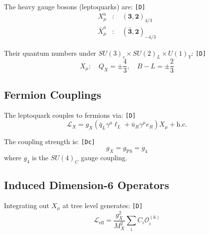 \documentclass[11pt,a4paper]{article}
\newcommand{\tagD}{\textcolor{green!50!black}{\texttt{[D]}}}
\newcommand{\tagDc}{\textcolor{blue!70!black}{\texttt{[Dc]}}}
\theoremstyle{definition}
\begin{document}
The heavy gauge bosons (leptoquarks) are: \tagD{}
\begin{align}
\label{eq:leptoquark-X}
X_\mu^a &: \quad (\mathbf{3}, \mathbf{2})_{4/3} \\
\label{eq:leptoquark-Xbar}
\bar{X}_\mu^a &: \quad (\bar{\mathbf{3}}, \mathbf{2})_{-4/3}
\end{align}

Their quantum numbers under $SU(3)_c \times SU(2)_L \times U(1)_Y$: \tagD{}
\begin{equation}
\label{eq:X-quantum-numbers}
X_\mu : \quad Q_X = \pm \frac{4}{3}, \quad B - L = \pm \frac{2}{3}
\end{equation}

\subsection{Fermion Couplings}
\label{subsec:fermion-couplings}

The leptoquark couples to fermions via: \tagD{}
\begin{equation}
\label{eq:leptoquark-coupling}
\mathcal{L}_X = g_X \left( \bar{q}_L \gamma^\mu \ell_L + \bar{u}_R \gamma^\mu e_R \right) X_\mu + \text{h.c.}
\end{equation}

The coupling strength is: \tagDc{}
\begin{equation}
\label{eq:gx-def}
g_X = g_{\text{PS}} = g_4
\end{equation}
where $g_4$ is the $SU(4)_C$ gauge coupling.

\subsection{Induced Dimension-6 Operators}
\label{subsec:dim6-operators}

Integrating out $X_\mu$ at tree level generates: \tagD{}
\begin{equation}
\label{eq:effective-lagrangian}
\mathcal{L}_{\text{eff}} = \frac{g_X^2}{M_X^2} \sum_i C_i \mathcal{O}_i^{(6)}
\end{equation}
\end{document}
